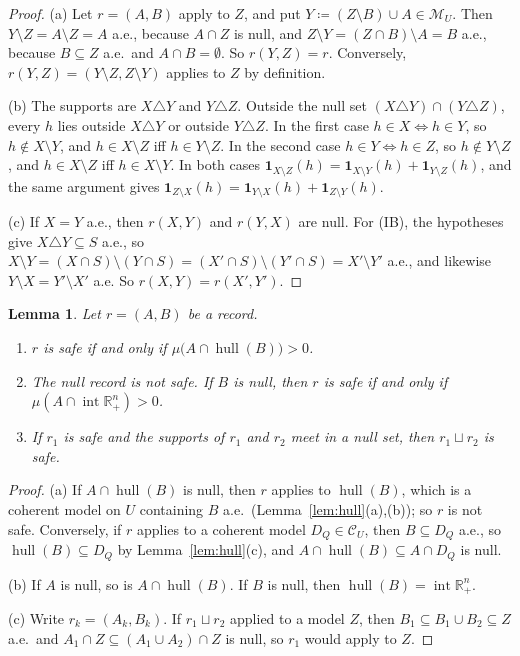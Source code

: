 \documentclass[11pt]{article}
\newcommand{\R}{\mathbb{R}}
\newcommand{\one}{\mathbf{1}}
\newcommand{\M}{\mathcal{M}}
\newcommand{\CC}{\mathcal{C}}
\newcommand{\hull}{\operatorname{hull}}
\newcommand{\Rpp}{\inter\R^n_{+}}
\DeclareMathOperator{\inter}{int}
\theoremstyle{plain}
\newtheorem{lemma}[theorem]{Lemma}
\theoremstyle{definition}
\theoremstyle{remark}
\begin{document}
\begin{proof}
(a) Let $r=(A,B)$ apply to $Z$, and put $Y\coloneqq(Z\setminus B)\cup A\in\M_U$. Then
$Y\setminus Z=A\setminus Z=A$ a.e., because $A\cap Z$ is null, and $Z\setminus Y=(Z\cap
B)\setminus A=B$ a.e., because $B\subseteq Z$ a.e.\ and $A\cap B=\emptyset$. So
$r(Y,Z)=r$. Conversely, $r(Y,Z)=(Y\setminus Z,Z\setminus Y)$ applies to $Z$ by
definition.

(b) The supports are $X\triangle Y$ and $Y\triangle Z$. Outside the null set $(X\triangle
Y)\cap(Y\triangle Z)$, every $h$ lies outside $X\triangle Y$ or outside $Y\triangle Z$.
In the first case $h\in X\iff h\in Y$, so $h\notin X\setminus Y$, and $h\in X\setminus Z$
iff $h\in Y\setminus Z$. In the second case $h\in Y\iff h\in Z$, so $h\notin Y\setminus
Z$, and $h\in X\setminus Z$ iff $h\in X\setminus Y$. In both cases $\one_{X\setminus Z}(h)
=\one_{X\setminus Y}(h)+\one_{Y\setminus Z}(h)$, and the same argument gives
$\one_{Z\setminus X}(h)=\one_{Y\setminus X}(h)+\one_{Z\setminus Y}(h)$.

(c) If $X=Y$ a.e., then $r(X,Y)$ and $r(Y,X)$ are null. For (IB), the hypotheses give
$X\triangle Y\subseteq S$ a.e., so $X\setminus Y=(X\cap S)\setminus(Y\cap S)=(X'\cap S)
\setminus(Y'\cap S)=X'\setminus Y'$ a.e., and likewise $Y\setminus X=Y'\setminus X'$
a.e. So $r(X,Y)=r(X',Y')$.
\end{proof}

\begin{lemma}\label{lem:safe}
Let $r=(A,B)$ be a record.
\begin{enumerate}[label=(\alph*)]
  \item $r$ is safe if and only if $\mu\bigl(A\cap\hull(B)\bigr)>0$.
  \item The null record is not safe. If $B$ is null, then $r$ is safe if and only if
  $\mu(A\cap\Rpp)>0$.
  \item If $r_1$ is safe and the supports of $r_1$ and $r_2$ meet in a null set, then
  $r_1\sqcup r_2$ is safe.
\end{enumerate}
\end{lemma}

\begin{proof}
(a) If $A\cap\hull(B)$ is null, then $r$ applies to $\hull(B)$, which is a coherent model
on $U$ containing $B$ a.e.\ (Lemma~\ref{lem:hull}(a),(b)); so $r$ is not safe.
Conversely, if $r$ applies to a coherent model $D_Q\in\CC_U$, then $B\subseteq D_Q$ a.e.,
so $\hull(B)\subseteq D_Q$ by Lemma~\ref{lem:hull}(c), and $A\cap\hull(B)\subseteq A\cap
D_Q$ is null.

(b) If $A$ is null, so is $A\cap\hull(B)$. If $B$ is null, then $\hull(B)=\Rpp$.

(c) Write $r_k=(A_k,B_k)$. If $r_1\sqcup r_2$ applied to a model $Z$, then $B_1\subseteq
B_1\cup B_2\subseteq Z$ a.e.\ and $A_1\cap Z\subseteq(A_1\cup A_2)\cap Z$ is null, so
$r_1$ would apply to $Z$.
\end{proof}
\end{document}
